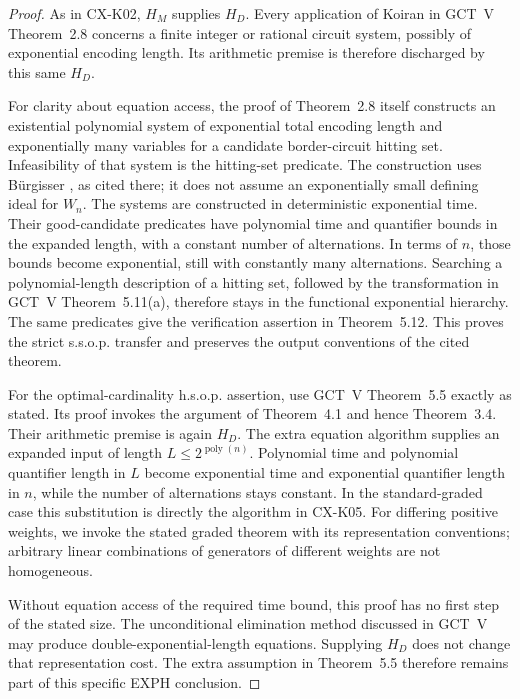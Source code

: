 \begin{proof}
As in CX-K02, $H_M$ supplies $H_D$. Every application of Koiran in
GCT~V Theorem~2.8 concerns a finite integer or rational circuit system,
possibly of exponential encoding length. Its arithmetic premise is
therefore discharged by this same $H_D$.

For clarity about equation access, the proof of Theorem~2.8 itself
constructs an existential polynomial system of exponential total
encoding length and exponentially many variables for a candidate
border-circuit hitting set. Infeasibility of that system is the
hitting-set predicate. The construction uses
B\"urgisser \cite[Theorem~5.7]{Burgisser04}, as cited there; it does
not assume an exponentially small defining ideal for $W_n$.
The systems are constructed in deterministic exponential time.
Their good-candidate predicates have polynomial time and quantifier
bounds in the expanded length, with a constant number of
alternations. In terms of $n$, those bounds become exponential,
still with constantly many alternations. Searching a polynomial-length
description of a hitting set, followed by the transformation in
GCT~V Theorem~5.11(a), therefore stays in the functional exponential
hierarchy. The same predicates give the verification assertion in
Theorem~5.12. This proves the strict s.s.o.p. transfer and preserves
the output conventions of the cited theorem.

For the optimal-cardinality h.s.o.p. assertion, use GCT~V
Theorem~5.5 exactly as stated. Its proof invokes the argument of
Theorem~4.1 and hence Theorem~3.4. Their arithmetic premise is again
$H_D$. The extra equation algorithm supplies an expanded input of
length $L\le 2^{\operatorname{poly}(n)}$. Polynomial time and
polynomial quantifier length in $L$ become exponential time and
exponential quantifier length in $n$, while the number of alternations
stays constant. In the standard-graded case this substitution is
directly the algorithm in CX-K05. For differing positive weights,
we invoke the stated graded theorem with its representation
conventions; arbitrary linear combinations of generators of different
weights are not homogeneous.

Without equation access of the required time bound, this proof has
no first step of the stated size. The unconditional elimination
method discussed in GCT~V may produce double-exponential-length
equations. Supplying $H_D$ does not change that representation cost.
The extra assumption in Theorem~5.5 therefore remains part of this
specific EXPH conclusion.
\end{proof}

